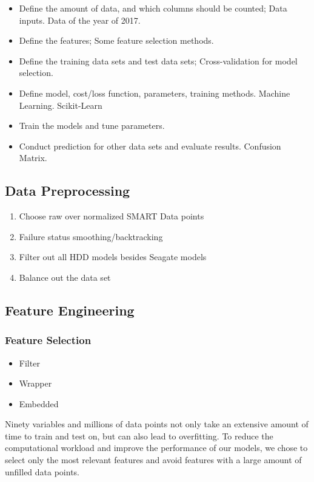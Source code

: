 \documentclass[12pt,a4paper,english]{amsart}
\begin{document}
\begin{itemize}
	\item Define the amount of data, and which columns should be counted; Data inputs.
			Data of the year of 2017.
	\item Define the features; Some feature selection methods.
	\item Define the training data sets and test data sets; Cross-validation for model selection.
	\item Define model, cost/loss function, parameters, training methods. Machine Learning. Scikit-Learn
	\item Train the models and tune parameters.
	\item Conduct prediction for other data sets and evaluate results. Confusion Matrix.
\end{itemize}

\subsection{Data Preprocessing}


\begin{enumerate}
	\item Choose raw over normalized SMART Data points
	\item Failure status smoothing/backtracking
	\item Filter out all HDD models besides Seagate models
	\item Balance out the data set
\end{enumerate}

\subsection{Feature Engineering}

\subsubsection*{Feature Selection}

\begin{itemize}
	\item Filter
	\item Wrapper
	\item Embedded
\end{itemize}

Ninety variables and millions of data points not only take an extensive amount of time to train and test on, but can also lead to overfitting. To reduce the computational workload and improve the performance of our models, we chose   to   select   only   the   most   relevant   features   and   avoid   features   with   a   large   amount   of   unfilled   data   points.
%
\end{document}
